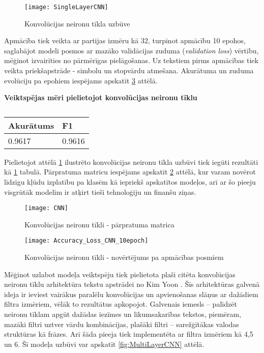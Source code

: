 \begin{figure}[H]
	\centering
	\texttt{[image: SingleLayerCNN]}
	\caption{Konvolūcijas neironu tīkla uzbūve}
	\label{fig:SingleLayerCNN}
\end{figure}

\pagebreak
Apmācība tiek veikta ar partijas izmēru kā 32, turpinot apmācību 10 epohos, saglabājot modeli posmos ar mazāko validācijas zuduma (\textit{validation loss}) vērtību, mēģinot izvairīties no pārmērīgas pielāgošanas. Uz tekstiem pirms apmācības tiek veikta priekšapstrāde - simbolu un stopvārdu atmešana. Akurātuma un zuduma evolūciju pa epohiem iespējams apskatīt \ref{fig:Accuracy_Loss_CNN_10epoch} attēlā.

\begin{table}[H]
\centering
\caption{\label{tab:score_cnn}}
\textbf{Veiktspējas mēri pielietojot konvolūcijas neironu tīklu\\}
\begin{tabular}{|l|l|}
\hline
Akurātums & F1 \\ \hline
0.9617 & 0.9616  \\ \hline
\end{tabular}
\end{table}

Pielietojot attēlā \ref{fig:SingleLayerCNN} ilustrēto konvolūcijas neironu tīkla uzbūvi tiek iegūti rezultāti kā \ref{tab:score_cnn} tabulā. Pārpratuma matricu iespējams apskatīt \ref{fig:CNN} attēlā, kur varam novērot līdzīgu kļūdu izplatību pa klasēm kā iepriekš apskatītos modeļos, arī ar šo pieeju visgrūtāk modelim ir atķirt tieši tehnoloģiju un finanšu ziņas.

\begin{figure}[H]
	\centering
	\texttt{[image: CNN]}
	\caption{Konvolūcijas neironu tīkli - pārpratuma matrica}
	\label{fig:CNN}
\end{figure}

\begin{figure}[H]
	\texttt{[image: Accuracy\_Loss\_CNN\_10epoch]}
	\caption{Konvolūcijas neironu tīkli - novērtējums pa apmācības posmiem}
	\label{fig:Accuracy_Loss_CNN_10epoch}
\end{figure}

Mēģinot uzlabot modeļa veiktspēju tiek pielietota plaši citēta konvolūcijas neironu tīklu arhitektūra tekstu apstrādei no Kim Yoon \cite{kimYoonCNN}. Šīs arhitektūras galvenā ideja ir ieviest vairākus paralēlu konvolūcijas un apvienošanas slāņus ar dažādiem filtra izmēriem, vēlāk to rezultātus apkopojot. Galvenais iemesls – palīdzēt neironu tīklam apgūt dažādas iezīmes un likumsakarības tekstos, piemēram, mazāki filtri uztver vārdu kombinācijas, plašāki filtri – sarežģītākas valodas struktūras kā frāzes. Arī šāda pieeja tiek implementēta ar filtra izmēriem kā 4,5 un 6. Šī modeļa uzbūvi var apskatīt \ref{fig:MultiLayerCNN} attēlā.


